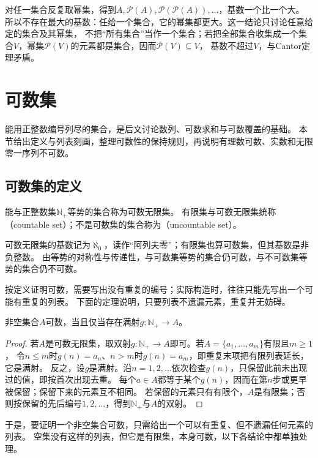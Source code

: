 对任一集合反复取幂集，得到$A,\mathcal P(A),\mathcal P(\mathcal P(A)),\ldots$，基数一个比一个大。
所以不存在最大的基数：任给一个集合，它的幂集都更大。这一结论只讨论任意给定的集合及其幂集，
不把“所有集合”当作一个集合；若把全部集合收集成一个集合$V$，幂集$\mathcal P(V)$的元素都是集合，因而$\mathcal P(V)\subseteq V$，
基数不超过$V$，与Cantor定理矛盾。

\section{可数集}
\label{sec:comb-countable-sets}

能用正整数编号列尽的集合，是后文讨论数列、可数求和与可数覆盖的基础。
本节给出定义与列表刻画，整理可数性的保持规则，再说明有理数可数、实数和无限零一序列不可数。

\subsection{可数集的定义}
\label{sec:countable-set-definition}

\begin{definition}[可数集]
\label{def:analysis-countable-set}
能与正整数集$\mathbb N_+$等势的集合称为可数无限集。
有限集与可数无限集统称（countable set）；不是可数集的集合称为（uncountable set）。
\end{definition}
可数无限集的基数记为$\aleph_0$，读作“阿列夫零”；有限集也算可数集，但其基数是非负整数。
由等势的对称性与传递性，与可数集等势的集合仍可数，与不可数集等势的集合仍不可数。

按定义证明可数，需要写出没有重复的编号；实际构造时，往往只能先写出一个可能有重复的列表。
下面的定理说明，只要列表不遗漏元素，重复并无妨碍。
\begin{theorem}[可数集的列表刻画]
\label{thm:comb-countable-surjection}
非空集合$A$可数，当且仅当存在满射$g:\mathbb N_+\to A$。
\end{theorem}
\begin{proof}
若$A$是可数无限集，取双射$g:\mathbb N_+\to A$即可。若$A=\{a_1,\ldots,a_m\}$有限且$m\geq1$，
令$n\leq m$时$g(n)=a_n$、$n>m$时$g(n)=a_m$，即重复末项把有限列表延长，它是满射。
反之，设$g$是满射。沿$n=1,2,\ldots$依次检查$g(n)$，只保留此前未出现过的值，即按首次出现去重。
每个$a\in A$都等于某个$g(n)$，因而在第$n$步或更早被保留；保留下来的元素互不相同。
若保留的元素只有有限个，$A$是有限集；否则按保留的先后编号$1,2,\ldots$，得到$\mathbb N_+$与$A$的双射。
\end{proof}
于是，要证明一个非空集合可数，只需给出一个可以有重复、但不遗漏任何元素的列表。
空集没有这样的列表，但它是有限集，本身可数，以下各结论中都单独处理。

